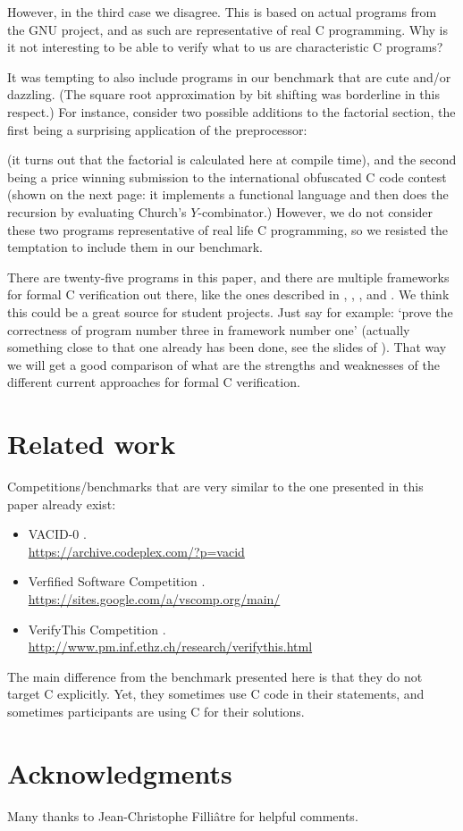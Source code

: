 \documentclass{article}
\begin{document}
However, in the third case we disagree.
This is based on actual programs from the GNU project,
and as such are representative of real C programming.
Why is it not interesting to be able to verify what
to us are characteristic C programs?

It was tempting to also include programs in our benchmark that are cute and/or dazzling.
(The square root approximation by bit shifting was borderline in this respect.)
For instance, consider two possible additions to the factorial
section,
the first being a surprising application of the preprocessor:


(it turns out that the factorial is calculated here at compile time),
and the second being a price winning submission to the international
obfuscated C code contest
(shown on the next page: it implements a functional language and then does the recursion by
evaluating Church's $Y$-combinator.)
However, we do not consider these two programs representative of
real life C programming, so we resisted the temptation to include them in our benchmark.

There are twenty-five programs in this paper, and there are multiple
frameworks for formal C verification out there, like the ones described
in \cite{app:11}, \cite{cor:cuo:kir:mar:pre:puc:sig:yak:18}, \cite{dah:mos:san:tob:sch:09}, \cite{gre:and:klei:12} and \cite{jac:sma:phi:vog:pen:pie:11}.
We think this could be a great source for student projects.
Just say for example: `prove the correctness of program number three in framework
number one' (actually something close to that one already has been done, see the slides of \cite{wie:16:1}).
That way we will get a good comparison of what are the strengths and
weaknesses of the different current approaches for formal C verification.

\section{Related work}

Competitions/benchmarks that are very similar to the one presented in this paper
already exist:
\begin{itemize}
\item
VACID-0 \cite{lei:mos:10}. \\
\url{https://archive.codeplex.com/?p=vacid}

\item
Verfified Software Competition \cite{xxx}. \\
\url{https://sites.google.com/a/vscomp.org/main/}

\item
VerifyThis Competition \cite{xxx}. \\
\url{http://www.pm.inf.ethz.ch/research/verifythis.html}

\end{itemize}
The main difference from the benchmark
presented here is that they do not target C explicitly.
Yet, they sometimes use C code in their statements, and sometimes
participants are using C for their solutions.

\section*{Acknowledgments}
Many thanks to Jean-Christophe Filli\^atre for helpful comments.



\end{document}
